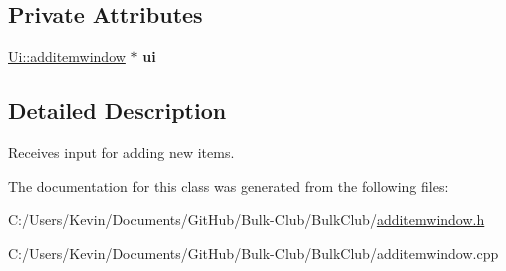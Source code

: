 \subsection*{Private Attributes}
\begin{DoxyCompactItemize}
\item 
\mbox{\label{classadditemwindow_ab86ac20ceb487df1524b8fb77fc97087}} 
\mbox{\hyperlink{class_ui_1_1additemwindow}{Ui\+::additemwindow}} $\ast$ {\bfseries ui}
\end{DoxyCompactItemize}


\subsection{Detailed Description}
Receives input for adding new items. 

The documentation for this class was generated from the following files\+:\begin{DoxyCompactItemize}
\item 
C\+:/\+Users/\+Kevin/\+Documents/\+Git\+Hub/\+Bulk-\/\+Club/\+Bulk\+Club/\mbox{\hyperlink{additemwindow_8h}{additemwindow.\+h}}\item 
C\+:/\+Users/\+Kevin/\+Documents/\+Git\+Hub/\+Bulk-\/\+Club/\+Bulk\+Club/additemwindow.\+cpp\end{DoxyCompactItemize}
